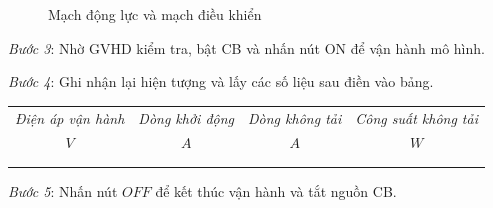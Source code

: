 \documentclass[13pt,a4paper]{extarticle}
\begin{document}
\begin{list}{--}{}
\begin{figure}[!h]
\begin{center}
\end{center}
\caption{Mạch động lực và mạch điều khiển}\label{mach-dong-luc-tu-de}
\end{figure}
\item \textit{Bước 3}: Nhờ GVHD kiểm tra, bật CB và nhấn nút ON để vận hành mô hình.
\item \textit{Bước 4}: Ghi nhận lại hiện tượng và lấy các số liệu sau điền vào bảng.
\begin{center}
\begin{tabular}{|c|c|c|c|}\hline
\textit{Điện áp vận hành} & \textit{Dòng khởi động} & \textit{Dòng không tải} & \textit{Công suất không tải}\\ 
$V$ & $A$ & $A$ & $W$ \\ \hline
& & & \\ \hline
& & & \\ \hline
\end{tabular}
\end{center}
\item \textit{Bước 5}: Nhấn nút $OFF$ để kết thúc vận hành và tắt nguồn CB.
\end{list}
\newpage
\end{document}
